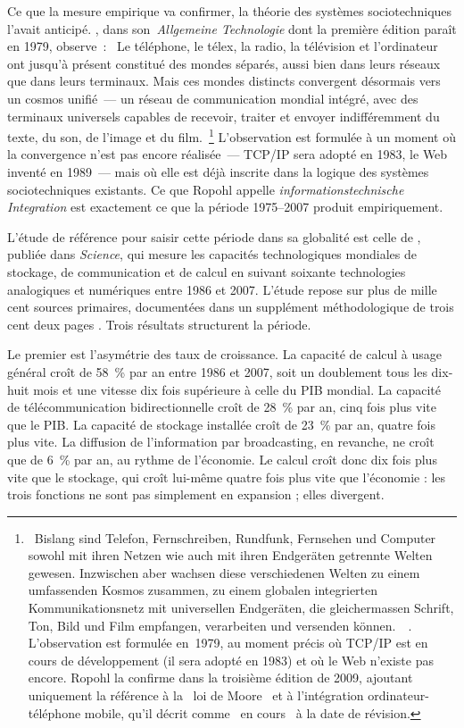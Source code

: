 Ce que la mesure empirique va confirmer, la théorie des systèmes sociotechniques l'avait anticipé. \textcite{ropohl_systemtheorie_1979}, dans son~\emph{Allgemeine Technologie} dont la première édition paraît en 1979, observe~: \og~Le téléphone, le télex, la radio, la télévision et l'ordinateur ont jusqu'à présent constitué des mondes séparés, aussi bien dans leurs réseaux que dans leurs terminaux. Mais ces mondes distincts convergent désormais vers un cosmos unifié~--- un réseau de communication mondial intégré, avec des terminaux universels capables de recevoir, traiter et envoyer indifféremment du texte, du son, de l'image et du film.~\fg\footnote{\og~Bislang sind Telefon, Fernschreiben, Rundfunk, Fernsehen und Computer sowohl mit ihren Netzen wie auch mit ihren Endgeräten getrennte Welten gewesen. Inzwischen aber wachsen diese verschiedenen Welten zu einem umfassenden Kosmos zusammen, zu einem globalen integrierten Kommunikationsnetz mit universellen Endgeräten, die gleichermassen Schrift, Ton, Bild und Film empfangen, verarbeiten und versenden können.~\fg~\parencite[Fallbeispiel \og~Computer~\fg, 3.~Aufl.]{ropohl_systemtheorie_1979}. L'observation est formulée en~1979, au moment précis où TCP/IP est en cours de développement (il sera adopté en 1983) et où le Web n'existe pas encore. Ropohl la confirme dans la troisième édition de 2009, ajoutant uniquement la référence à la \og~loi de Moore~\fg{} et à l'intégration ordinateur-téléphone mobile, qu'il décrit comme \og~en cours~\fg{} à la date de révision.} L'observation est formulée à un moment où la convergence n'est pas encore réalisée~--- TCP/IP sera adopté en 1983, le Web inventé en 1989~--- mais où elle est déjà inscrite dans la logique des systèmes sociotechniques existants. Ce que Ropohl appelle \emph{informationstechnische Integration} est exactement ce que la période 1975--2007 produit empiriquement.

L'étude de référence pour saisir cette période dans sa globalité est celle de \textcite{hilbert_worlds_2011}, publiée dans \emph{Science}, qui mesure les capacités technologiques mondiales de stockage, de communication et de calcul en suivant soixante technologies analogiques et numériques entre 1986 et 2007. L'étude repose sur plus de mille cent sources primaires, documentées dans un supplément méthodologique de trois cent deux pages \parencite{lopez_methodological_2012}. Trois résultats structurent la période.
 
Le premier est l'asymétrie des taux de croissance. La capacité de calcul à usage général croît de 58~\% par an entre 1986 et 2007, soit un doublement tous les dix-huit mois et une vitesse dix fois supérieure à celle du PIB mondial. La capacité de télécommunication bidirectionnelle croît de 28~\% par an, cinq fois plus vite que le PIB. La capacité de stockage installée croît de 23~\% par an, quatre fois plus vite. La diffusion de l'information par broadcasting, en revanche, ne croît que de 6~\% par an, au rythme de l'économie. Le calcul croît donc dix fois plus vite que le stockage, qui croît lui-même quatre fois plus vite que l'économie : les trois fonctions ne sont pas simplement en expansion ; elles divergent.
 
